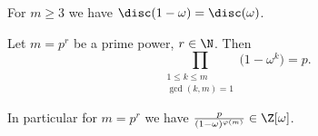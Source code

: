 
\begin{lem}
	For \( m \geq 3 \) we have \( \disc(1 - \omega) = \disc(\omega) \).
\end{lem}

\begin{lem}\label{thm:1.31}
	Let \( m = p^r \) be a prime power, \( r \in \N \).
	Then
	\[ \prod_{\substack{1 \leq k \leq m\\\gcd(k,m)=1}} \big(1-\omega^k\big) = p. \]
\end{lem}

\begin{rem*}
	In particular for \( m = p^r \) we have \( \frac{p}{(1-\omega)^{\varphi(m)}} \in \Z[\omega] \).
\end{rem*}